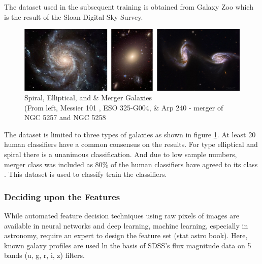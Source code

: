 The dataset used in the subsequent training is obtained from Galaxy Zoo which is the result of the Sloan Digital Sky Survey.

\begin{figure}[H]
	\centering
	\includegraphics[width=\linewidth, height=\textheight, keepaspectratio]{images/galaxies/collage.png}
	\caption{Spiral, Elliptical, and \& Merger Galaxies\\(From left, Messier 101 \parencite{nasajpl_caltech_pinwheel_2017}, ESO 325-G004\parencite{space_telescope_science_institute_hubblesite_2007}, \&  Arp 240 - merger of NGC 5257 and NGC 5258 \parencite{european_space_agency_esa_2019}}
	\label{fig:colg}
\end{figure}

The dataset is limited to three types of galaxies as shown in figure \ref{fig:colg}. At least 20 human classifiers have a common consensus on the results. For type elliptical and spiral there is a unanimous classification. And due to low sample numbers, merger class was included as 80\% of the human classifiers have agreed to its class \parencite{lintott_galaxy_2008, lintott_galaxy_2011}. This dataset is used to classify train the classifiers.

\subsubsection{Deciding upon the Features}
While automated feature decision techniques using raw pixels of images are available in neural networks and deep learning, machine learning, especially in astronomy, require an expert to design the feature set (stat astro book). Here, known galaxy profiles are used ln the basis of SDSS's flux magnitude data on 5 bands (u, g, r, i, z) filters.

